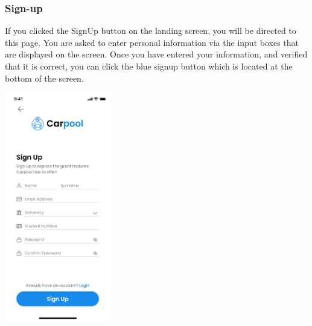 \documentclass[hidelinks, 12pt, a4paper]{article}
\begin{document}
\subsubsection{Sign-up}
If you clicked the SignUp button on the landing screen, you will be directed to this page. You are asked to enter personal information via the input boxes that are displayed on the screen. Once you have entered your information, and verified that it is correct, you can click the blue signup button which is located at the bottom of the screen.
\begin{center}
  \includegraphics[height=10cm]{images/Register.png}
\end{center}
\vspace{1cm}
\end{document}
